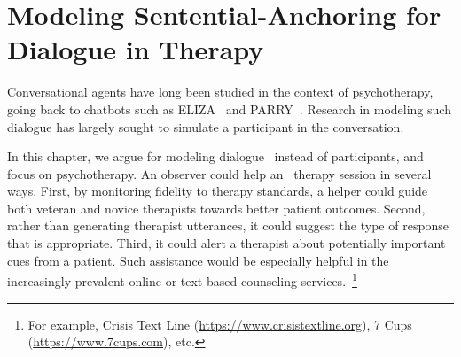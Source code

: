 \chapter{Modeling Sentential-Anchoring for Dialogue in Therapy}
\label{chap:snt}

Conversational agents have long been studied in the context of
psychotherapy, going back to chatbots such as
ELIZA~\citep{weizenbaum1966eliza} and
PARRY~\citep{colby1975artificial}. Research in modeling such dialogue
has largely sought to simulate a participant in the conversation.

In this chapter, we argue for modeling dialogue~
instead of participants, and focus on psychotherapy. An observer
could help an~ therapy session in several ways.
First, by monitoring fidelity to therapy standards, a helper could
guide both veteran and novice therapists towards better patient
outcomes. Second, rather than generating therapist utterances, it
could suggest the type of response that is appropriate. Third, it
could alert a therapist about potentially important cues from a
patient.
%
Such assistance would be especially helpful in the increasingly
prevalent online or text-based counseling services.~\footnote{For
  example, Crisis Text Line (\url{https://www.crisistextline.org}),
  7 Cups (\url{https://www.7cups.com}), etc.}

